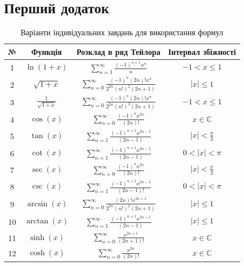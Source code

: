 \documentclass[14pt,a4paper,twoside]{article}
\begin{document}
	\section{Перший додаток}\label{sec:appendix1}
	\begin{table}[h!]
		\centering
		\caption{Варіанти індивідуальних завдань для використання формул}
		\label{tab:taylor_series}
		\begin{tabular}{|c|c||c||c|}
			\hline
			№ & Функція & Розклад в ряд Тейлора & Інтервал збіжності \\
			\hline
			\hline
			1 & \( \ln(1+x) \) & \( \displaystyle\sum_{n=1}^{\infty} \frac{(-1)^{n+1} x^n}{n} \) & \( -1 < x \leq 1 \) \\
			\hline
			2 & \( \sqrt{1+x} \) & \( \displaystyle\sum_{n=0}^{\infty} \frac{(-1)^n (2n)! x^n}{2^{2n} (n!)^2 (2n+1)} \) & \( |x| \leq 1 \) \\
			\hline
			3 & \( \frac{1}{\sqrt{1+x}} \) & \( \displaystyle\sum_{n=0}^{\infty} \frac{(-1)^n (2n)! x^n}{2^{2n} (n!)^2 (2n+1)} \) & \( -1 < x \leq 1 \) \\
			\hline
			4 & \( \cos(x) \) & \( \displaystyle\sum_{n=0}^{\infty} \frac{(-1)^n x^{2n}}{(2n)!} \) & \( x \in \mathbb{C} \) \\
			\hline
			5 & \( \tan(x) \) & \( \displaystyle\sum_{n=1}^{\infty} \frac{(-1)^{n+1} x^{2n-1}}{(2n-1)} \) & \( |x| < \frac{\pi}{2} \) \\
			\hline
			6 & \( \cot(x) \) & \( \displaystyle\sum_{n=1}^{\infty} \frac{(-1)^{n+1} x^{2n-1}}{(2n-1)} \) & \( 0 < |x| < \pi \) \\
			\hline
			7 & \( \sec(x) \) & \( \displaystyle\sum_{n=0}^{\infty} \frac{(-1)^n x^{2n}}{(2n)!} \) & \( |x| < \frac{\pi}{2} \) \\
			\hline
			8 & \( \csc(x) \) & \( \displaystyle\sum_{n=1}^{\infty} \frac{(-1)^{n+1} x^{2n-1}}{(2n-1)!} \) & \( 0 < |x| < \pi \) \\
			\hline
			9 & \( \arcsin(x) \) & \( \displaystyle\sum_{n=0}^{\infty} \frac{(2n)! x^{2n+1}}{2^{2n} (n!)^2 (2n+1)} \) & \( |x| \leq 1 \) \\
			\hline
			10 & \( \arctan(x) \) & \( \displaystyle\sum_{n=1}^{\infty} \frac{(-1)^{n+1} x^{2n-1}}{(2n-1)} \) & \( |x| \leq 1 \) \\
			\hline
			11 & \( \sinh(x) \) & \( \displaystyle\sum_{n=0}^{\infty} \frac{x^{2n+1}}{(2n+1)!} \) & \( x \in \mathbb{C} \) \\
			\hline
			12 & \( \cosh(x) \) & \( \displaystyle\sum_{n=0}^{\infty} \frac{x^{2n}}{(2n)!} \) & \( x \in \mathbb{C} \) \\

\end{tabular}
\end{table}
\end{document}

